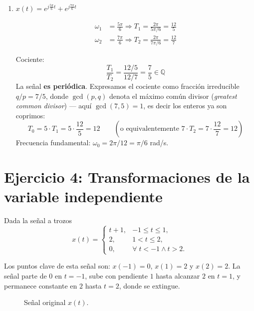 \documentclass[10pt,a4paper]{article}
\begin{document}
\begin{enumerate}[label=\textbf{\alph*)}]
		Cocientes:
		\[
		\frac{T_1}{T_2} = \frac{1}{\pi/5} = \frac{5}{\pi} \notin \mathbb{Q}
		\]
		
		Como $5/\pi$ es irracional (pues $\pi$ es trascendente), la señal \textbf{no es periódica}. Basta que un par de componentes tenga cociente de períodos irracional para que la suma no pueda repetirse.
		
		\item $x(t) = e^{j\frac{5\pi}{6}t} + e^{j\frac{7\pi}{6}t}$
		
		\begin{align*}
		\omega_1 &= \frac{5\pi}{6} \Rightarrow T_1 = \frac{2\pi}{5\pi/6} = \frac{12}{5} \\
		\omega_2 &= \frac{7\pi}{6} \Rightarrow T_2 = \frac{2\pi}{7\pi/6} = \frac{12}{7}
		\end{align*}
		
		Cociente:
		\[
		\frac{T_1}{T_2} = \frac{12/5}{12/7} = \frac{7}{5} \in \mathbb{Q}
		\]
		La señal \textbf{es periódica}. Expresamos el cociente como fracción irreducible $q/p = 7/5$, donde $\gcd(p,q)$ denota el máximo común divisor (\textit{greatest common divisor}) — aquí $\gcd(7,5)=1$, es decir los enteros ya son coprimos:
		\[
		T_0 = 5\cdot T_1 = 5\cdot\frac{12}{5} = 12 \qquad (\text{o equivalentemente } 7\cdot T_2 = 7\cdot\frac{12}{7} = 12)
		\]
		Frecuencia fundamental: $\omega_0 = 2\pi/12 = \pi/6$ rad/s.
	\end{enumerate}

	\section*{Ejercicio 4: Transformaciones de la variable independiente}
	
	Dada la señal a trozos
	\[
	x(t)=
	\begin{cases}
	t+1, & -1\leq t\leq 1, \\
	2, & 1<t\leq 2, \\
	0, & \forall\; t<-1 \wedge t>2.
	\end{cases}
	\]
	
	Los puntos clave de esta señal son: $x(-1)=0$, $x(1)=2$ y $x(2)=2$. La señal parte de $0$ en $t=-1$, sube con pendiente $1$ hasta alcanzar $2$ en $t=1$, y permanece constante en $2$ hasta $t=2$, donde se extingue.
	
	\begin{figure}[H]
		\centering
		
		\caption{Señal original $x(t)$.}
		\label{fig:ejer5_orig}
	\end{figure}
	
\end{document}
